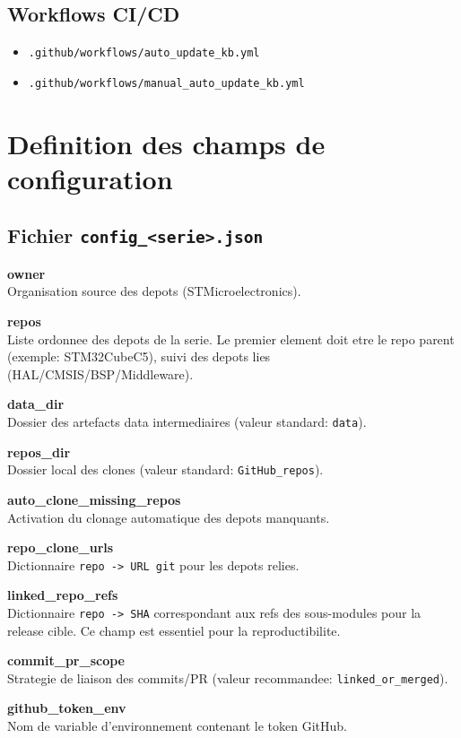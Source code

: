 \documentclass[11pt,a4paper]{article}
\begin{document}
\subsection{Workflows CI/CD}
\begin{itemize}[leftmargin=*]
  \item \texttt{.github/workflows/auto\_update\_kb.yml}
  \item \texttt{.github/workflows/manual\_auto\_update\_kb.yml}
\end{itemize}

\section{Definition des champs de configuration}
\subsection{Fichier \texttt{config\_<serie>.json}}
\textbf{owner}\\
Organisation source des depots (STMicroelectronics).

\textbf{repos}\\
Liste ordonnee des depots de la serie. Le premier element doit etre le repo parent
(exemple: STM32CubeC5), suivi des depots lies (HAL/CMSIS/BSP/Middleware).

\textbf{data\_dir}\\
Dossier des artefacts data intermediaires (valeur standard: \texttt{data}).

\textbf{repos\_dir}\\
Dossier local des clones (valeur standard: \texttt{GitHub\_repos}).

\textbf{auto\_clone\_missing\_repos}\\
Activation du clonage automatique des depots manquants.

\textbf{repo\_clone\_urls}\\
Dictionnaire \texttt{repo -> URL git} pour les depots relies.

\textbf{linked\_repo\_refs}\\
Dictionnaire \texttt{repo -> SHA} correspondant aux refs des sous-modules pour la
release cible. Ce champ est essentiel pour la reproductibilite.

\textbf{commit\_pr\_scope}\\
Strategie de liaison des commits/PR (valeur recommandee: \texttt{linked\_or\_merged}).

\textbf{github\_token\_env}\\
Nom de variable d'environnement contenant le token GitHub.
\end{document}
